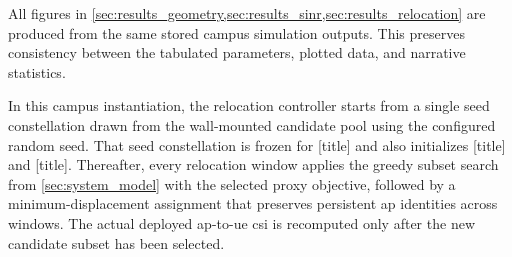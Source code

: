 All figures in \cref{sec:results_geometry,sec:results_sinr,sec:results_relocation} are produced from the same stored campus simulation outputs. This preserves consistency between the tabulated parameters, plotted data, and narrative statistics.

In this campus instantiation, the relocation controller starts from a single seed constellation drawn from the wall-mounted candidate pool using the configured random seed. That seed constellation is frozen for [title] and also initializes [title] and [title]. Thereafter, every relocation window applies the greedy subset search from \cref{sec:system_model} with the selected proxy objective, followed by a minimum-displacement assignment that preserves persistent \gls{ap} identities across windows. The actual deployed \gls{ap}-to-\gls{ue} \gls{csi} is recomputed only after the new candidate subset has been selected.
